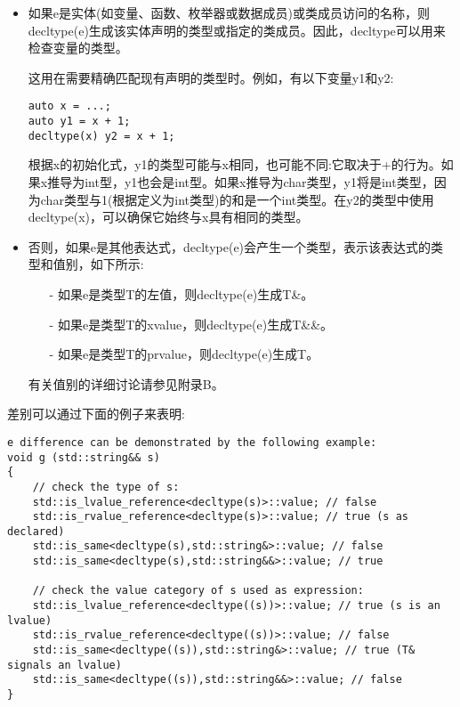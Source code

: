 \begin{itemize}
\item 
如果e是实体(如变量、函数、枚举器或数据成员)或类成员访问的名称，则decltype(e)生成该实体声明的类型或指定的类成员。因此，decltype可以用来检查变量的类型。

这用在需要精确匹配现有声明的类型时。例如，有以下变量y1和y2:

\begin{lstlisting}[style=styleCXX]
auto x = ...;
auto y1 = x + 1;
decltype(x) y2 = x + 1;
\end{lstlisting}

根据x的初始化式，y1的类型可能与x相同，也可能不同:它取决于+的行为。如果x推导为int型，y1也会是int型。如果x推导为char类型，y1将是int类型，因为char类型与1(根据定义为int类型)的和是一个int类型。在y2的类型中使用decltype(x)，可以确保它始终与x具有相同的类型。

\item 
否则，如果e是其他表达式，decltype(e)会产生一个类型，表示该表达式的类型和值别，如下所示:

\begin{itemize}
\item[-]
如果e是类型T的左值，则decltype(e)生成T\&。

\item[-]
如果e是类型T的xvalue，则decltype(e)生成T\&\&。

\item[-]
如果e是类型T的prvalue，则decltype(e)生成T。
\end{itemize}

有关值别的详细讨论请参见附录B。

\end{itemize}

差别可以通过下面的例子来表明:

\begin{lstlisting}[style=styleCXX]
e difference can be demonstrated by the following example:
void g (std::string&& s)
{
	// check the type of s:
	std::is_lvalue_reference<decltype(s)>::value; // false
	std::is_rvalue_reference<decltype(s)>::value; // true (s as declared)
	std::is_same<decltype(s),std::string&>::value; // false
	std::is_same<decltype(s),std::string&&>::value; // true
	
	// check the value category of s used as expression:
	std::is_lvalue_reference<decltype((s))>::value; // true (s is an lvalue)
	std::is_rvalue_reference<decltype((s))>::value; // false
	std::is_same<decltype((s)),std::string&>::value; // true (T& signals an lvalue)
	std::is_same<decltype((s)),std::string&&>::value; // false
}
\end{lstlisting}

